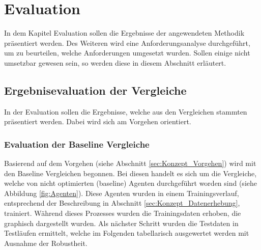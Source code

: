 \chapter{Evaluation} \label{chap:Evaluation}
In dem Kapitel Evaluation sollen die Ergebnisse der angewendeten Methodik präsentiert werden. Des Weiteren wird eine Anforderungsanalyse durchgeführt, um zu beurteilen, welche Anforderungen umgesetzt wurden. Sollen einige nicht umsetzbar gewesen sein, so werden diese in diesem Abschnitt erläutert.

\section{Ergebnisevaluation der Vergleiche} \label{sec:Evaluation_Ergebnisevaluation}
In der Evaluation sollen die Ergebnisse, welche aus den Vergleichen stammten präsentiert werden. Dabei wird sich am Vorgehen orientiert.

\subsection{Evaluation der Baseline Vergleiche}
Basierend auf dem Vorgehen (siehe Abschnitt \ref{sec:Konzept_Vorgehen}) wird mit den Baseline Vergleichen begonnen. Bei diesen handelt es sich um die Vergleiche, welche von  nicht optimierten (baseline) Agenten durchgeführt worden sind (siehe Abbildung \ref{fig:Agenten}). Diese Agenten wurden in einem Trainingsverlauf, entsprechend der Beschreibung in Abschnitt \ref{sec:Konzept_Datenerhebung}, trainiert. 
Während dieses Prozesses wurden die Trainingsdaten erhoben, die graphisch dargestellt wurden. 
Als nächster Schritt wurden die Testdaten in Testläufen ermittelt, welche im Folgenden tabellarisch ausgewertet werden mit Ausnahme der Robustheit.

